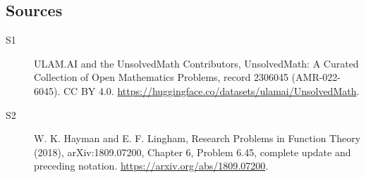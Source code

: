 \documentclass[11pt]{article}
\begin{document}
\subsection{Sources}
\begin{description}
\item[\hypertarget{source:2306045:1}{S1}] ULAM.AI and the UnsolvedMath Contributors, UnsolvedMath: A Curated Collection of Open Mathematics Problems, record 2306045 (AMR-022-6045). CC BY 4.0. \url{https://huggingface.co/datasets/ulamai/UnsolvedMath}.
\item[\hypertarget{source:2306045:2}{S2}] W. K. Hayman and E. F. Lingham, Research Problems in Function Theory (2018), arXiv:1809.07200, Chapter 6, Problem 6.45, complete update and preceding notation. \url{https://arxiv.org/abs/1809.07200}.
\end{description}
\label{end:2306045}
\end{document}

